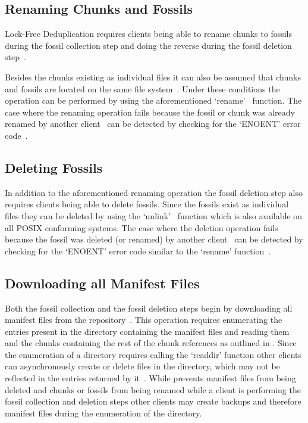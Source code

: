 \subsection{Renaming Chunks and Fossils}

Lock-Free Deduplication requires clients being able to rename chunks to fossils
during the fossil collection step and doing the reverse during the fossil deletion
step~\cite[section `Two Step Fossil Deletion']{Duplicacy}.

Besides the chunks existing as individual files it can also be assumed that
chunks and fossils are located on the same file system~\cite[section `Naming Chunks']{Duplicacy}.
Under these conditions the operation can be performed by using the aforementioned
`rename'~\cite{Posix} function.
The case where the renaming operation fails because the fossil or chunk was already
renamed by another client~\cite[Theorem 2]{Duplicacy} can be detected by checking for the
`ENOENT' error code~\cite[function `rename', section `ERRORS']{Posix}.

\subsection{Deleting Fossils}

In addition to the aforementioned renaming operation the fossil deletion step
also requires clients being able to delete fossils.
Since the fossils exist as individual files they can be deleted by using the
`unlink'~\cite{Posix} function which is also available on all POSIX conforming systems.
The case where the deletion operation fails because the fossil was deleted (or renamed)
by another client~\cite[Theorem 2]{Duplicacy} can be detected by checking for the
`ENOENT' error code similar to the `rename' function~\cite[function `unlink', section `ERRORS']{Posix}.

\subsection{Downloading all Manifest Files}

Both the fossil collection and the fossil deletion steps begin by downloading all
manifest files from the repository~\cite[Algorithm 1 and 2]{Duplicacy}.
This operation requires enumerating the entries present in the directory containing
the manifest files and reading them and the chunks containing the rest of the
chunk references as outlined in .
Since the enumeration of a directory requires calling the `readdir' function other
clients can asynchronously create or delete files in the directory, which may not
be reflected in the entries returned by it~\cite[function `readdir', section `DESCRIPTION']{Posix}.
While  prevents manifest files from being deleted and chunks
or fossils from being renamed while a client is performing the fossil collection and
deletion steps other clients may create backups and therefore manifest files during
the enumeration of the directory.

